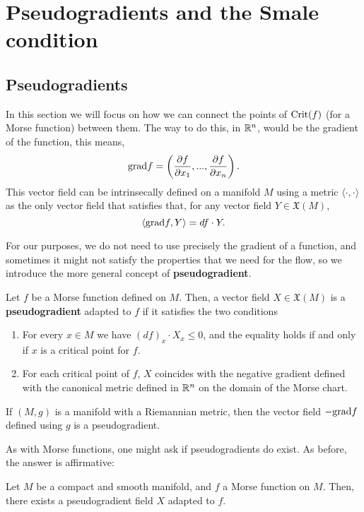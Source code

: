 \section{Pseudogradients and the Smale condition} \label{section:pseudogradients}

\subsection{Pseudogradients}

In this section we will focus on how we can connect the points of $\mathrm{Crit}(f)$ (for a Morse function) between them. The way to do this, in $\mathbb{R}^n$, would be the gradient of the function, this means,
$$\mathrm{grad} f = \left( \frac{\partial f}{\partial x_1},...,\frac{\partial f}{\partial x_n} \right) .$$
This vector field can be intrinsecally defined on a manifold $M$ using a metric $\langle \cdot , \cdot \rangle$ as the only vector field that satisfies that, for any vector field $Y \in \mathfrak{X}(M)$,
$$\langle \mathrm{grad} f, Y \rangle = d f \cdot Y .$$

For our purposes, we do not need to use precisely the gradient of a function, and sometimes it might not satisfy the properties that we need for the flow, so we introduce the more general concept of {\bf pseudogradient}.

\begin{deff}
Let $f$ be a Morse function defined on $M$. Then, a vector field $X \in \mathfrak{X}(M)$ is a {\bf pseudogradient} adapted to $f$ if it satisfies the two conditions

\begin{enumerate}
\item For every $x \in M$ we have $(d f)_x \cdot X_x \leq 0$, and the equality holds if and only if $x$ is a critical point for $f$.
\item For each critical point of $f$, $X$ coincides with the negative gradient defined with the canonical metric defined in $\mathbb{R}^n$ on the domain of the Morse chart.
\end{enumerate}
\end{deff}

\begin{rmrk}
If $(M,g)$ is a manifold with a Riemannian metric, then the vector field $- \mathrm{grad} f$ defined using $g$ is a pseudogradient.
\end{rmrk}

As with Morse functions, one might ask if pseudogradients do exist. As before, the answer is affirmative:

\begin{prop}
Let $M$ be a compact and smooth manifold, and $f$ a Morse function on $M$. Then, there exists a pseudogradient field $X$ adapted to $f$.
\end{prop}

